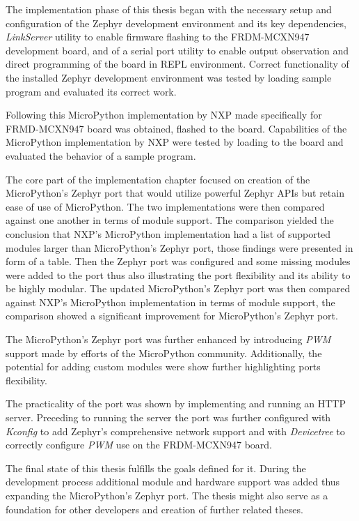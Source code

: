 \documentclass[twoside, 12pt]{article}
\begin{document}
The implementation phase of this thesis began with the necessary setup and configuration of
the Zephyr development environment and its key dependencies, \textit{LinkServer} utility to
enable firmware flashing to the FRDM-MCXN947 development board, and of a serial port utility
to enable output observation and direct programming of the board in REPL environment.
Correct functionality of the installed Zephyr development environment was tested by loading
sample program and evaluated its correct work.

Following this MicroPython implementation by NXP made specifically for FRMD-MCXN947 board was
obtained, flashed to the board. Capabilities of the MicroPython implementation by NXP were
tested by loading to the board and evaluated the behavior of a sample program.

The core part of the implementation chapter focused on creation of the
MicroPython's Zephyr port that would utilize powerful Zephyr APIs but retain ease of use of
MicroPython. The two implementations were then compared against one another in terms of module
support. The comparison yielded the conclusion that NXP's MicroPython implementation had a
list of supported modules larger than MicroPython's Zephyr port, those findings were presented
in form of a table. Then the Zephyr port was configured and some missing modules were added to
the port thus also illustrating the port flexibility and its ability to be highly modular.
The updated MicroPython's Zephyr port was then compared against NXP's MicroPython 
implementation in terms of module support, the comparison showed a significant improvement for
MicroPython's Zephyr port.

The MicroPython's Zephyr port was further enhanced by introducing \textit{PWM} support made by
efforts of the MicroPython community. Additionally, the potential for adding custom modules
were show further highlighting ports flexibility.

The practicality of the port was shown by implementing and running an HTTP server. Preceding
to running the server the port was further configured with \textit{Kconfig} to add Zephyr's
comprehensive network support and with \textit{Devicetree} to correctly configure \textit{PWM}
use on the FRDM-MCXN947 board.

The final state of this thesis fulfills the goals defined for it. During the development
process additional module and hardware support was added thus expanding the MicroPython's
Zephyr port. The thesis might also serve as a foundation for other developers and creation of further related theses.
\end{document}
